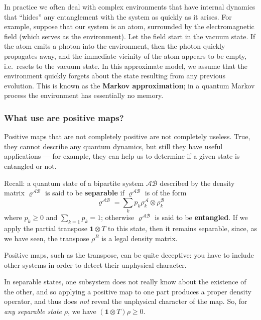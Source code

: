 \documentclass[fleqn]{article}
\newenvironment{idea}{\noindent}{\medskip}
\begin{document}
In practice we often deal with complex environments that have internal dynamics that ``hides'' any entanglement with the system as quickly as it arises.
For example, suppose that our system is an atom, surrounded by the electromagnetic field (which serves as the environment).
Let the field start in the vacuum state.
If the atom emits a photon into the environment, then the photon quickly propagates away, and the immediate vicinity of the atom appears to be empty, i.e.~resets to the vacuum state.
In this approximate model, we assume that the environment quickly forgets about the state resulting from any previous evolution.
This is known as the \textbf{Markov approximation};
in a quantum Markov process the environment has essentially no memory.

\hypertarget{what-use-are-positive-maps}{%
\subsubsection{What use are positive maps?}\label{what-use-are-positive-maps}}

Positive maps that are not completely positive are not completely useless.
True, they cannot describe any quantum dynamics, but still they have useful applications --- for example, they can help us to determine if a given state is entangled or not.

Recall: a quantum state of a bipartite system \(\mathcal{AB}\) described by the density matrix \(\varrho^{\mathcal{AB}}\) is said to be \textbf{separable} if \(\varrho^{\mathcal{AB}}\) is of the form
\[
  \varrho^{\mathcal{AB}}
  = \sum_k p_k \rho^{\mathcal{A}}_k \otimes\rho^{\mathcal{B}}_k
\]
where \(p_k \geqslant 0\) and \(\sum_{k=1} p_k=1\); otherwise \(\varrho^{\mathcal{AB}}\) is said to be \textbf{entangled}.
If we apply the partial transpose \(\mathbf{1}\otimes T\) to this state, then it remains separable, since, as we have seen, the transpose \(\rho^B\) is a legal density matrix.

\begin{idea}
Positive maps, such as the transpose, can be quite deceptive: you have to include other systems in order to detect their unphysical character.

\end{idea}

In separable states, one subsystem does not really know about the existence of the other, and so applying a positive map to one part produces a proper density operator, and thus does \emph{not} reveal the unphysical character of the map.
So, for \emph{any separable state} \(\rho\), we have \((\mathbf{1}\otimes T)\rho\geqslant 0\).
\end{document}
